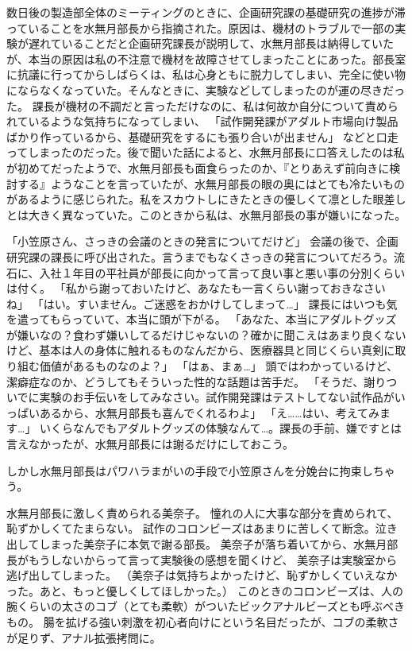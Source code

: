 数日後の製造部全体のミーティングのときに、企画研究課の基礎研究の進捗が滞っていることを水無月部長から指摘された。原因は、機材のトラブルで一部の実験が遅れていることだと企画研究課長が説明して、水無月部長は納得していたが、本当の原因は私の不注意で機材を故障させてしまったことにあった。部長室に抗議に行ってからしばらくは、私は心身ともに脱力してしまい、完全に使い物にならなくなっていた。そんなときに、実験などしてしまったのが運の尽きだった。
課長が機材の不調だと言っただけなのに、私は何故か自分について責められているような気持ちになってしまい、
「試作開発課がアダルト市場向け製品ばかり作っているから、基礎研究をするにも張り合いが出ません」
などと口走ってしまったのだった。後で聞いた話によると、水無月部長に口答えしたのは私が初めてだったようで、水無月部長も面食らったのか、『とりあえず前向きに検討する』ようなことを言っていたが、水無月部長の眼の奥にはとても冷たいものがあるように感じられた。私をスカウトしにきたときの優しくて凛とした眼差しとは大きく異なっていた。このときから私は、水無月部長の事が嫌いになった。


「小笠原さん、さっきの会議のときの発言についてだけど」
会議の後で、企画研究課の課長に呼び出された。言うまでもなくさっきの発言についてだろう。流石に、入社１年目の平社員が部長に向かって言って良い事と悪い事の分別くらいは付く。
「私から謝っておいたけど、あなたも一言くらい謝っておきなさいね」
「はい。すいません。ご迷惑をおかけしてしまって…」
課長にはいつも気を遣ってもらっていて、本当に頭が下がる。
「あなた、本当にアダルトグッズが嫌いなの？食わず嫌いしてるだけじゃないの？確かに聞こえはあまり良くないけど、基本は人の身体に触れるものなんだから、医療器具と同じくらい真剣に取り組む価値があるものなのよ？」
「はぁ、まぁ…」
頭ではわかっているけど、潔癖症なのか、どうしてもそういった性的な話題は苦手だ。
「そうだ、謝りついでに実験のお手伝いをしてみなさい。試作開発課はテストしてない試作品がいっぱいあるから、水無月部長も喜んでくれるわよ」
「え……はい、考えてみます…」
いくらなんでもアダルトグッズの体験なんて…。課長の手前、嫌ですとは言えなかったが、水無月部長には謝るだけにしておこう。

しかし水無月部長はパワハラまがいの手段で小笠原さんを分娩台に拘束しちゃう。



水無月部長に激しく責められる美奈子。
憧れの人に大事な部分を責められて、恥ずかしくてたまらない。
試作のコロンビーズはあまりに苦しくて断念。泣き出してしまった美奈子に本気で謝る部長。
美奈子が落ち着いてから、水無月部長がもうしないからって言って実験後の感想を聞くけど、
美奈子は実験室から逃げ出してしまった。
（美奈子は気持ちよかったけど、恥ずかしくていえなかった。あと、もっと優しくしてほしかった。）
このときのコロンビーズは、人の腕くらいの太さのコブ（とても柔軟）がついたビックアナルビーズとも呼ぶべきもの。
腸を拡げる強い刺激を初心者向けにという名目だったが、コブの柔軟さが足りず、アナル拡張拷問に。







